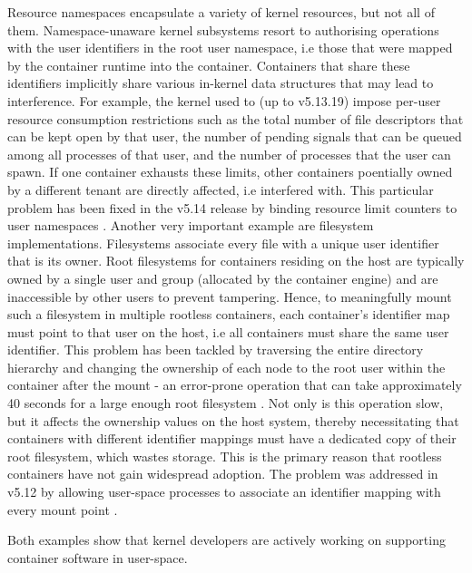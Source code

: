 Resource namespaces encapsulate a variety of kernel resources, but not all of them.
Namespace-unaware kernel subsystems resort to authorising operations with the user identifiers 
in the root user namespace, i.e those that were mapped by the container runtime into the container.
Containers that share these identifiers implicitly share various in-kernel data structures 
that may lead to interference. For example, the kernel used to (up to v5.13.19) impose per-user resource consumption 
restrictions such as the total number of file descriptors that can be kept open by that user, the number of 
pending signals that can be queued among all processes of that user, and the number of processes 
that the user can spawn. If one container exhausts these limits, other containers poentially owned by a different tenant are directly affected, i.e 
interfered with. This particular problem has been fixed in the v5.14 release by binding resource limit counters to user namespaces
\cite{https://patchwork.kernel.org/project/linux-hardening/cover/cover.1619094428.git.legion@kernel.org/}.
Another very important example are filesystem implementations. Filesystems associate every file 
with a unique user identifier that is its owner. Root filesystems for containers residing on the 
host are typically owned by a single user and group (allocated by the container engine) and are inaccessible by other users 
to prevent tampering. Hence, to meaningfully mount such a filesystem in multiple rootless containers, 
each container's identifier map must point to that user on the host, i.e all containers must 
share the same user identifier. This problem has been tackled by traversing the entire directory hierarchy and changing the 
ownership of each node to the root user within the container after the mount - an error-prone operation 
that can take approximately 40 seconds for a large enough root filesystem \cite{https://github.com/containerd/containerd/pull/4734}.
Not only is this operation slow, but it affects the ownership values on the host system, thereby necessitating that 
containers with different identifier mappings must have a dedicated copy of their root filesystem, which wastes storage.
This is the primary reason that rootless containers have not gain widespread adoption.
The problem was addressed in v5.12 by allowing user-space processes to associate an identifier mapping with every mount point \cite{https://lwn.net/Articles/896255/}.

Both examples show that kernel developers are actively working on supporting container software in user-space.
